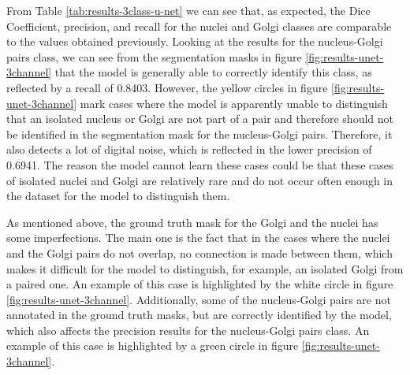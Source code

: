 \begin{table}[!htb]
\centering
\caption{Average metric values after testing the 3 class 3D U-Net model on two pre-processed microscopic images}
\label{tab:results-3class-u-net}
\end{table}

From Table \ref{tab:results-3class-u-net} we can see that, as expected, the Dice Coefficient, precision, and recall for the nuclei and Golgi classes are comparable to the values obtained previously. Looking at the results for the nucleus-Golgi pairs class, we can see from the segmentation masks in figure \ref{fig:results-unet-3channel} that the model is generally able to correctly identify this class, as reflected by a recall of 0.8403. However, the yellow circles in figure \ref{fig:results-unet-3channel} mark cases where the model is apparently unable to distinguish that an isolated nucleus or Golgi are not part of a pair and therefore should not be identified in the segmentation mask for the nucleus-Golgi pairs. Therefore, it also detects a lot of digital noise, which is reflected in the lower precision of 0.6941. The reason the model cannot learn these cases could be that these cases of isolated nuclei and Golgi are relatively rare and do not occur often enough in the dataset for the model to distinguish them.

As mentioned above, the ground truth mask for the Golgi and the nuclei has some imperfections. The main one is the fact that in the cases where the nuclei and the Golgi pairs do not overlap, no connection is made between them, which makes it difficult for the model to distinguish, for example, an isolated Golgi from a paired one. An example of this case is highlighted by the white circle in figure \ref{fig:results-unet-3channel}. Additionally, some of the nucleus-Golgi pairs are not annotated in the ground truth masks, but are correctly identified by the model, which also affects the precision results for the nucleus-Golgi pairs class. An example of this case is highlighted by a green circle in figure \ref{fig:results-unet-3channel}.

